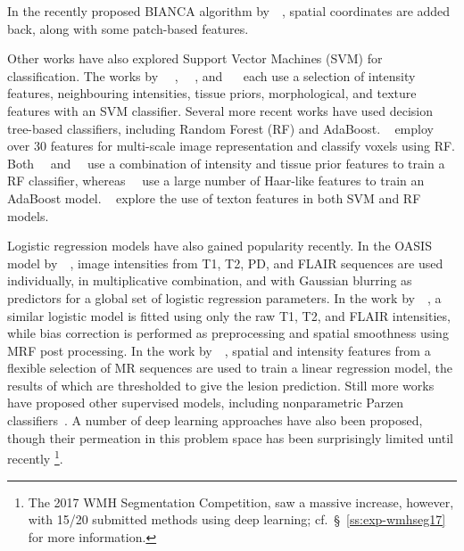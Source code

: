 In the recently proposed BIANCA algorithm by~\citeauthor{Griffanti2016}~\cite{Griffanti2016},
spatial coordinates are added back, along with some patch-based features.
\par
Other works have also explored Support Vector Machines (SVM) for classification.
The works by%
~\citeauthor{Lao2006}~\cite{Lao2006},%
~\citeauthor{Abdullah2012}~\cite{Abdullah2012}, and%
~\citeauthor{Scully2010}~\cite{Scully2010}
each use a selection of
intensity features, neighbouring intensities, tissue priors, morphological, and texture features
with an SVM classifier.
Several more recent works have used decision tree-based classifiers,
including Random Forest (RF) and AdaBoost.
\citeauthor{Akselrod-Ballin2009}~\cite{Akselrod-Ballin2009} employ over 30 features
for multi-scale image representation and classify voxels using RF.
Both~\citeauthor{Geremia2011}~\cite{Geremia2011} and~\citeauthor{Roy2015}~\cite{Roy2015}
use a combination of intensity and tissue prior features to train a RF classifier,
whereas~\citeauthor{Wels2008}~\cite{Wels2008} use a large number of Haar-like features
to train an AdaBoost model.
\citeauthor{Ithapu2014}~\cite{Ithapu2014} explore the use of
texton features in both SVM and RF models.
\par
Logistic regression models have also gained popularity recently.
In the OASIS model by~\citeauthor{Sweeney2013}~\cite{Sweeney2013},
image intensities from T1, T2, PD, and FLAIR sequences are used
individually, in multiplicative combination, and with Gaussian blurring
as predictors for a global set of logistic regression parameters.
In the work by~\citeauthor{Zhan2017}~\cite{Zhan2017}, a similar logistic model is fitted using
only the raw T1, T2, and FLAIR intensities, while
bias correction is performed as preprocessing and spatial smoothness using MRF post processing.
In the work by~\citeauthor{Dadar2017}~\cite{Dadar2017},
spatial and intensity features from a flexible selection of MR sequences are used to
train a linear regression model, the results of which are thresholded to give the lesion prediction.
Still more works have proposed other supervised models,
including nonparametric Parzen classifiers~\cite{Sajja2006}.
A number of deep learning approaches have also been proposed,
though their permeation in this problem space has been surprisingly limited until recently%
\footnote{The 2017 WMH Segmentation Competition, saw a massive increase, however, with
  15/20 submitted methods using deep learning;
  cf.~\S~\ref{ss:exp-wmhseg17} for more information.}.

